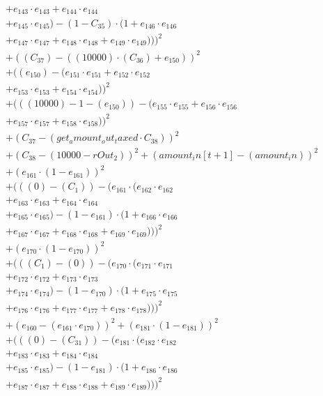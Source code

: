 \documentclass[10pt, a4paper]{article}
\begin{document}
\begin{small}
\begin{align*}
& + e_{143} \cdot e_{143} + e_{144} \cdot e_{144} \\
& + e_{145} \cdot e_{145}) - (1 - C_{35}) \cdot (1 + e_{146} \cdot e_{146} \\
& + e_{147} \cdot e_{147} + e_{148} \cdot e_{148} + e_{149} \cdot e_{149})))^{2} \\
& + ((C_{37}) - ((10000)  \cdot  (C_{36}) + e_{150}))^{2} \\
& + ((e_{150}) - (e_{151} \cdot e_{151} + e_{152} \cdot e_{152} \\
& + e_{153} \cdot e_{153} + e_{154} \cdot e_{154}))^{2} \\
& + (((10000) - 1 - (e_{150})) - (e_{155} \cdot e_{155} + e_{156} \cdot e_{156} \\
& + e_{157} \cdot e_{157} + e_{158} \cdot e_{158}))^{2} \\
& + (C_{37} - (get_amount_out_taxed  \cdot  C_{38}))^{2} \\
& + (C_{38} - (10000 - rOut_2))^{2} + (amount_in[t+1] - (amount_in))^{2} \\
& + (e_{161} \cdot (1 - e_{161}))^{2} \\
& + (((0) - (C_{1})) - (e_{161} \cdot (e_{162} \cdot e_{162} \\
& + e_{163} \cdot e_{163} + e_{164} \cdot e_{164} \\
& + e_{165} \cdot e_{165}) - (1 - e_{161}) \cdot (1 + e_{166} \cdot e_{166} \\
& + e_{167} \cdot e_{167} + e_{168} \cdot e_{168} + e_{169} \cdot e_{169})))^{2} \\
& + (e_{170} \cdot (1 - e_{170}))^{2} \\
& + (((C_{1}) - (0)) - (e_{170} \cdot (e_{171} \cdot e_{171} \\
& + e_{172} \cdot e_{172} + e_{173} \cdot e_{173} \\
& + e_{174} \cdot e_{174}) - (1 - e_{170}) \cdot (1 + e_{175} \cdot e_{175} \\
& + e_{176} \cdot e_{176} + e_{177} \cdot e_{177} + e_{178} \cdot e_{178})))^{2} \\
& + (e_{160} - (e_{161} \cdot e_{170}))^{2} + (e_{181} \cdot (1 - e_{181}))^{2} \\
& + (((0) - (C_{31})) - (e_{181} \cdot (e_{182} \cdot e_{182} \\
& + e_{183} \cdot e_{183} + e_{184} \cdot e_{184} \\
& + e_{185} \cdot e_{185}) - (1 - e_{181}) \cdot (1 + e_{186} \cdot e_{186} \\
& + e_{187} \cdot e_{187} + e_{188} \cdot e_{188} + e_{189} \cdot e_{189})))^{2} \\

\end{align*}
\end{small}
\end{document}
